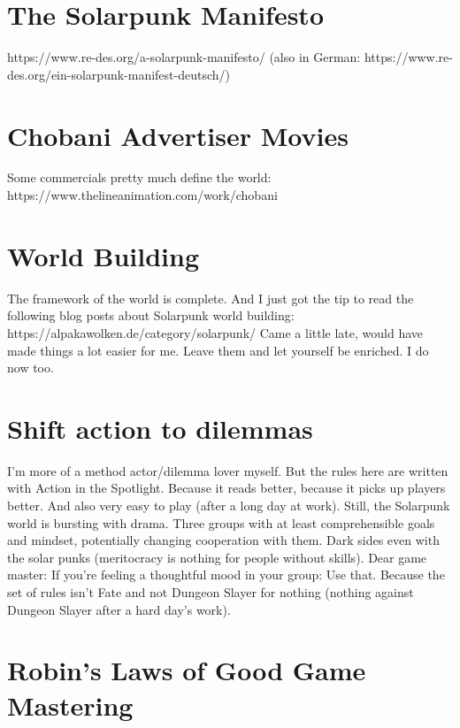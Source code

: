 \section{The Solarpunk Manifesto}

https://www.re-des.org/a-solarpunk-manifesto/
(also in German: https://www.re-des.org/ein-solarpunk-manifest-deutsch/)

\section{Chobani Advertiser Movies}
Some commercials pretty much define the world: https://www.thelineanimation.com/work/chobani

\section{World Building}
The framework of the world is complete. And I just got the tip to read the following blog posts about Solarpunk world building:
https://alpakawolken.de/category/solarpunk/
Came a little late, would have made things a lot easier for me. Leave them and let yourself be enriched. I do now too.

\section{Shift action to dilemmas}
I'm more of a method actor/dilemma lover myself. But the rules here are written with Action in the Spotlight. Because it reads
better, because it picks up players better. And also very easy to play (after a long day at work).
Still, the Solarpunk world is bursting with drama. Three groups with at least comprehensible goals and mindset, potentially changing
cooperation with them. Dark sides even with the solar punks (meritocracy is nothing for people without skills).
Dear game master: If you're feeling a thoughtful mood in your group: Use that. Because the set of rules isn't Fate and not
Dungeon Slayer for nothing (nothing against Dungeon Slayer after a hard day's work).

\section{Robin's Laws of Good Game Mastering}

